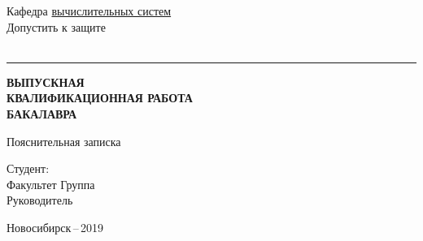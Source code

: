 \begin{titlepage}
    
    \vspace{0.5cm}

    \hfill
    \begin{minipage}{0.55\textwidth}
        Кафедра \underline{вычислительных систем} \\
        Допустить к защите \\
        \chiefpos \\
        \rule{3cm}{1pt} \chief
    \end{minipage}

    \vfill
    \begin{center}
        \LARGE
        \textbf{ВЫПУСКНАЯ \\ КВАЛИФИКАЦИОННАЯ РАБОТА \\ БАКАЛАВРА}
        \\ \vspace{2mm}
        \Large
        \topicname
        \normalsize
    \end{center}

    \begin{center}
        \large
        Пояснительная записка
    \end{center}
    \hfill
    \begin{minipage}{0.95\textwidth}
        Студент: \fio \\
        Факультет \underline{\faculty} Группа \underline{\group} \\
        Руководитель \underline{\thead} \\
    \end{minipage}
    \vfill
    \vfill
    \begin{center}
        Новосибирск\,--\,2019
    \end{center}
\end{titlepage}
\setcounter{page}{2}
\thispagestyle{empty}
\newpage
